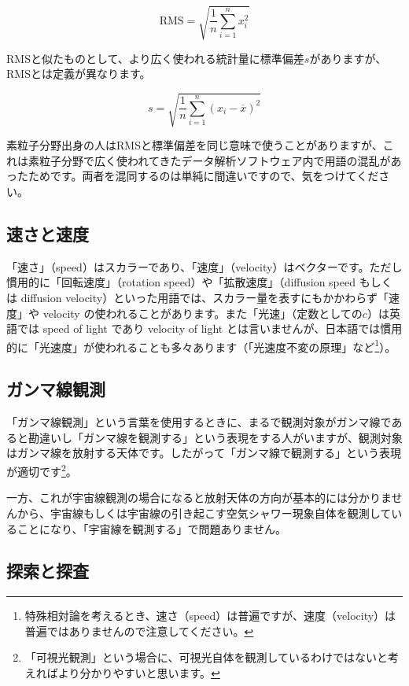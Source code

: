 \begin{equation}
\mathrm{RMS} = \sqrt{{\frac{1}{n} \sum \limits _{i=1}^n x_{i}^2}}
\end{equation}

RMSと似たものとして、より広く使われる統計量に標準偏差$s$がありますが、RMSとは定義が異なります。

\begin{equation}
 s = \sqrt{\frac{1}{n} \sum \limits _{i=1}^n (x_i - {\overline{x}})^2}
\end{equation}

素粒子分野出身の人はRMSと標準偏差を同じ意味で使うことがありますが、これは素粒子分野で広く使われてきたデータ解析ソフトウェア内で用語の混乱があったためです。両者を混同するのは単純に間違いですので、気をつけてください。

\subsection{速さと速度}

「速さ」（speed）はスカラーであり、「速度」（velocity）はベクターです。ただし慣用的に「回転速度」（rotation speed）や「拡散速度」（diffusion speed もしくは diffusion velocity）といった用語では、スカラー量を表すにもかかわらず「速度」や velocity の使われることがあります。また「光速」（定数としての$c$）は英語では speed of light であり velocity of light とは言いませんが、日本語では慣用的に「光速度」が使われることも多々あります（「光速度不変の原理」など\footnote{特殊相対論を考えるとき、速さ（speed）は普遍ですが、速度（velocity）は普遍ではありませんので注意してください。}）。

\subsection{ガンマ線観測}

「ガンマ線観測」という言葉を使用するときに、まるで観測対象がガンマ線であると勘違いし「ガンマ線を観測する」という表現をする人がいますが、観測対象はガンマ線を放射する天体です。したがって「ガンマ線で観測する」という表現が適切です\footnote{「可視光観測」という場合に、可視光自体を観測しているわけではないと考えればより分かりやすいと思います。}。

一方、これが宇宙線観測の場合になると放射天体の方向が基本的には分かりませんから、宇宙線もしくは宇宙線の引き起こす空気シャワー現象自体を観測していることになり、「宇宙線を観測する」で問題ありません。

\subsection{探索と探査}

